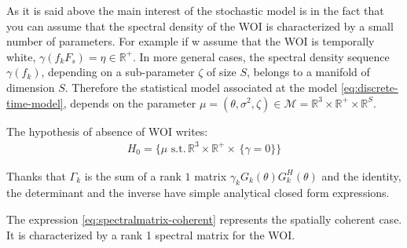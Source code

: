\documentclass[graybox]{svmult/styles/svmult}
\begin{document}
As it is said above the main interest of the stochastic model is in the fact that you can assume that the spectral density of the WOI is characterized by a small number of parameters. For example if w assume that the WOI is temporally white, $\gamma(f_{k}F_{s})=\eta\in \mathds{R}^{+}$. In more general cases, the spectral density sequence $\gamma(f_{k})$, depending on a sub-parameter $\zeta$ of size $S$, belongs to a manifold of dimension $S$. Therefore the statistical model associated at the model \eqref{eq:discrete-time-model},  depends on the parameter $\mu=(\theta,\sigma^{2},\zeta)\in\mathcal{M}=\mathds{R}^{3}\times \mathds{R}^{+}\times \mathds{R}^{S}$.

The hypothesis of absence of WOI writes:
 \begin{eqnarray}
 \label{eq:H0}
 H_{0}=\{\mu \,\,\mathrm{s.t.}\,\mathds{R}^{3}\times \mathds{R}^{+}\times\,\{\gamma=0\}\} 
 \end{eqnarray}

Thanks that $\Gamma_{k}$ is the sum of a rank $1$ matrix $\gamma_{k}G_{k}(\theta)G_{k}^{H}(\theta)$ and  the identity, the determinant and the inverse have simple analytical closed form expressions.

The expression \eqref{eq:spectralmatrix-coherent} represents the spatially coherent case. It is characterized by a rank 1 spectral matrix for the WOI. 
\end{document}
